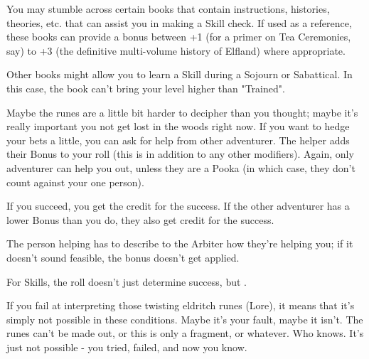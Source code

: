 {   You may stumble across certain books that contain instructions, histories, theories, etc. that can assist you in making a Skill check.  If used as a reference, these books can provide a bonus between +1 (for a primer on Tea Ceremonies, say) to +3 (the definitive multi-volume history of Elfland) where appropriate. 

   Other books might allow you to learn a Skill during a Sojourn or Sabattical.  In this case, the book can't bring your level higher than "Trained".



  Maybe the runes are a little bit harder to decipher than you thought; maybe it's really important you not get lost in the woods right now.  If you want to hedge your bets a little, you can ask for help from  other adventurer.  The helper adds their Bonus to your roll (this is in addition to any other modifiers).  Again, only  adventurer can help you out, unless they are a Pooka (in which case, they don't count against your one person).

  If you succeed, you get the credit for the success.  If the other adventurer has a lower Bonus than you do, they also get credit for the success.


  The person helping has to describe to the Arbiter how they're helping you; if it doesn't sound feasible, the bonus doesn't get applied.



  For Skills, the \RO roll doesn't just determine success, but .  

  If you fail at interpreting those twisting eldritch runes (Lore), it means that it's simply not possible in these conditions.  Maybe it's your fault, maybe it isn't.  The runes can't be made out, or this is only a fragment, or whatever.  Who knows.  It's just not possible - you tried, failed, and now you know.

}

